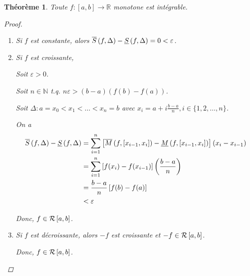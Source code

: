 \documentclass{report}
\newcommand*{\eps}{\varepsilon}
\newcommand*{\reels}{\mathbb{R}}
\newcommand*{\naturels}{\mathbb{N}}
\newtheorem*{thm}{Th\'eor\`eme}
\theoremstyle{definition}
\theoremstyle{remark}
\begin{document}
	\begin{thm}
		Toute $f:[a,b] \to \reels$ monotone est int\'egrable.
		\begin{proof}~

			\begin{enumerate}[label=(\arabic*)]
				\item Si $f$ est constante, alors $\ssup{f}-\sinf{f}=0<\eps$.
				\item Si $f$ est croissante,

				Soit $\eps>0$.

				Soit $n \in \naturels$ t.q. $n\eps>(b-a)(f(b)-f(a))$.

				Soit $\Delta:a=x_0<x_1<\dotsc<x_n=b$ avec $x_i=a+i\frac{b-a}{n}, i \in \{1,2,\dots,n\}$.

				On a
				\begin{align*}
					\ssup{f}-\sinf{f}&= \sum_{i=1}^{n}\left[ \msup{f}[x_{i-1},x_i] - \minf{f}[x_{i-1},x_i] \right] (x_i-x_{i-1})\\
					&= \sum_{i=1}^{n}\left[ f(x_i) - f(x_{i-1}) \right] \left( \frac{b-a}{n} \right)\\
					&= \frac{b-a}{n} \left[ f(b)-f(a) \right]\\
					&< \eps
				\end{align*}

				Donc, $f \in \riemann$.
				\item Si $f$ est d\'ecroissante, alors $-f$ est croissante et $-f \in \riemann$.

				Donc, $f \in \riemann$.
			\end{enumerate}
		\end{proof}
	\end{thm}
\end{document}
